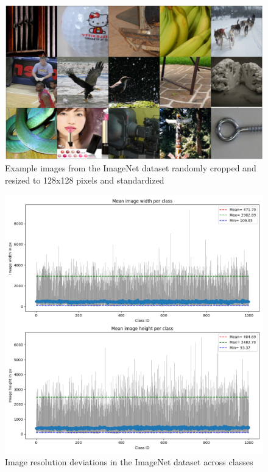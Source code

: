 \documentclass[10pt,a4paper,twoside]{article}
\begin{document}
\begin{figure}
    \centering
    \includegraphics[width=\textwidth]{../../sample_images/imagenet_unnormalized.png}
    \caption{Example images from the ImageNet dataset randomly cropped and resized to 128x128 pixels and standardized}
    \label{fig:imnet_example_normalized}
\end{figure}

\begin{figure}
    \centering
    \includegraphics[width=\textwidth]{../../sample_images/imagenet_sizes_errorbar.png}
    \caption{Image resolution deviations in the ImageNet dataset across classes}
    \label{fig:imnet_sizes_err}
\end{figure}
\end{document}
